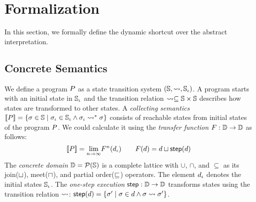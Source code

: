 \section{Formalization}

In this section, we formally define the dynamic shortcut over the abstract
interpretation.


\subsection{Concrete Semantics}


We define a program $P$ as a state transition system $(\mathbb{S}, \leadsto,
\mathbb{S}_\iota)$.  A program starts with an initial state in $\mathbb{S}_\iota$ and the
transition relation $\leadsto \subseteq \mathbb{S} \times \mathbb{S}$ describes how states
are transformed to other states.  A \textit{collecting semantics} $[\![{P}]\!] =
\{ \sigma \in \mathbb{S} \mid \sigma_\iota \in \mathbb{S}_\iota \wedge \sigma_\iota \leadsto^* \sigma \}$ consists of
reachable states from initial states of the program $P$.  We could calculate
it using the \textit{transfer function} $F: \mathbb{D} \rightarrow \mathbb{D}$ as
follows:
\[
  [\![{P}]\!] = \underset{n \rightarrow \infty}{\lim}{F^n(d_\iota)}\\
  \qquad
  F(d) = d \sqcup \textsf{step}(d)\\
\]
The \textit{concrete domain} $\mathbb{D} = \mathcal{P}(\mathbb{S})$ is a complete lattice
with $\cup$, $\cap$, and $\subseteq$ as its join($\sqcup$), meet($\sqcap$), and
partial order($\sqsubseteq$) operators.  The element $d_\iota$ denotes the initial
states $\mathbb{S}_\iota$.  The \textit{one-step execution} $\textsf{step}: \mathbb{D} \rightarrow
\mathbb{D}$ transforms states using the transition relation $\leadsto$: $\textsf{step}(d) =
\{ \sigma' \mid \sigma \in d \wedge \sigma \leadsto \sigma' \}$.


